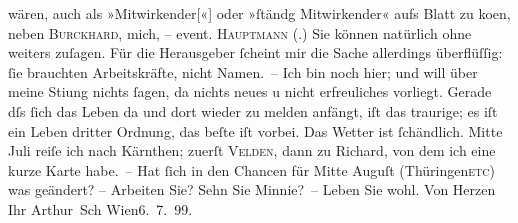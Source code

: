 \begin{ledgroupsized}[t]{13cm}
                    wären, auch als »Mitwirkender{[}«{]} oder »ſtändg Mitwirkender«
                    aufs Blatt zu ko{\geminationm}en, neben \textsc{Burckhard}, mich, – event. \textsc{Hauptmann} (\label{K_L00934_1v}\label{K_L00934_1h}.) Sie können natürlich ohne weiters zuſagen. Für die Herausgeber ſcheint
                    mir die Sache allerdings überflüſſig: ſie brauchten Arbeitskräfte, nicht
                    Namen. –\pend
           \pstart
           Ich bin noch hier; und will über meine {\pb}Sti{\geminationm}ung nichts ſagen, da nichts neues u nicht
                    erfreuliches vorliegt. Gerade dſs ſich das Leben da und dort wieder zu melden
                    anfängt, iſt das traurige; es iſt ein Leben dritter Ordnung, das beſte iſt
                    vorbei.\pend
           \pstart
           Das Wetter ist ſchändlich. Mitte Juli reiſe ich nach Kärnthen; zuerſt \textsc{Velden}, dann zu Richard, von dem ich eine
                    kurze Karte habe. – Hat ſich in den Chancen für Mitte Auguſt (Thü{\pb}ringen\textsc{etc}) was geändert? – Arbeiten Sie? Sehn Sie Minnie? –\pend
           \pstart Leben Sie wohl. Von Herzen Ihr \spacefill\mbox{Arthur Sch}\pend{}\pstart
           Wien6. 7. 99.\pend
           \endnumbering{}\end{ledgroupsized}  \newcommand{\dateiname}{L00934}\newcommand{\titel}{Arthur Schnitzler an Hugo von Hofmannsthal, 6. 7. 1899}\newcommand{\editorInnen}{ Martin Anton Müller und Gerd-Hermann Susen}
            \footnotesize
\begin{ledgroupsized}[t]{11.5cm}
\end{ledgroupsized}
         
      